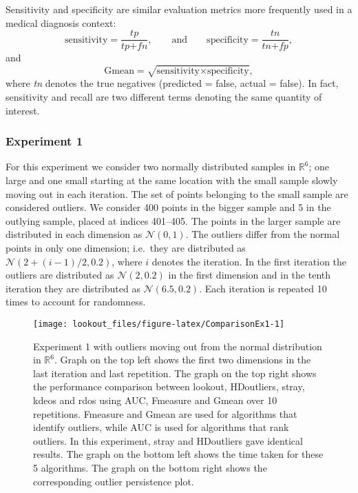 \documentclass[
]{article}
\begin{document}
Sensitivity and specificity are similar evaluation metrics more
frequently used in a medical diagnosis context:
\begin{equation}\label{eq:ss}
    \text{sensitivity} = \frac{ \textit{tp} }{\textit{tp} + \textit{fn}}  , \qquad \text{and} \qquad \text{specificity} = \frac{\textit{tn}}{\textit{tn} + \textit{fp}}  ,
\end{equation} and \begin{equation}\label{eq:gmean}
    \text{Gmean} = \sqrt{ \text{sensitivity} \times \text{specificity}}  ,
\end{equation} where \emph{tn} denotes the true negatives (predicted =
false, actual = false). In fact, sensitivity and recall are two
different terms denoting the same quantity of interest.

\hypertarget{experiment-1}{%
\subsubsection*{Experiment 1}\label{experiment-1}}

For this experiment we consider two normally distributed samples in
\(\mathbb{R}^6\); one large and one small starting at the same location
with the small sample slowly moving out in each iteration. The set of
points belonging to the small sample are considered outliers. We
consider 400 points in the bigger sample and 5 in the outlying sample,
placed at indices 401--405. The points in the larger sample are
distributed in each dimension as \(\mathcal{N}(0, 1)\). The outliers
differ from the normal points in only one dimension; i.e.~they are
distributed as \(\mathcal{N}\left(2 + (i-1)/2, 0.2 \right)\), where
\(i\) denotes the iteration. In the first iteration the outliers are
distributed as \(\mathcal{N}\left(2, 0.2 \right)\) in the first
dimension and in the tenth iteration they are distributed as
\(\mathcal{N}\left(6.5, 0.2 \right)\). Each iteration is repeated 10
times to account for randomness.

\begin{figure}
\texttt{[image: lookout\_files/figure-latex/ComparisonEx1-1]} \caption{Experiment 1 with outliers moving out from the normal distribution in $\mathbb{R}^6$. Graph on the top left shows the first two dimensions in the last iteration and last repetition.  The graph on the top right shows the performance comparison between lookout, HDoutliers, stray, kdeos and rdos using AUC, Fmeasure and Gmean over 10 repetitions. Fmeasure and Gmean are used for algorithms that identify outliers, while AUC is used for algorithms that rank outliers. In this experiment, stray and HDoutliers gave identical results. The graph on the bottom left shows the time taken for these 5 algorithms. The graph on the bottom right shows the corresponding outlier persistence plot.}\label{fig:ComparisonEx1}
\end{figure}
\end{document}
